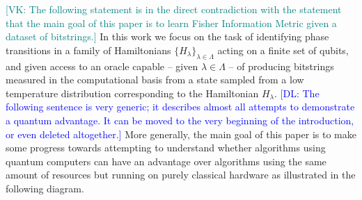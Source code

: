 \documentclass[american,aps,pra,reprint,floatfix,nofootinbib,superscriptaddress]{revtex4-2}
\newcommand{\VK}[1]{\textcolor{teal}{[VK: #1]}}
\newcommand{\DL}[1]{\textcolor{blue}{[DL: #1]}}
\begin{document}
\VK{The following statement is in the direct contradiction with the statement
that the main goal of this paper is to learn Fisher Information Metric
given a dataset of bitstrings.}
In this work we focus on the task of identifying phase transitions in a
family of Hamiltonians $\{H_{\lambda}\}_{\lambda \in \Lambda}$ acting on a finite
set of qubits, and given access to an oracle capable -- given $\lambda \in \Lambda$ --
of producing bitstrings measured in the computational basis from a state sampled
from a low temperature distribution corresponding to the Hamiltonian
$H_{\lambda}$. 
\DL{The following sentence is very generic; it describes almost all attempts to demonstrate a quantum advantage. It can be moved to the very beginning of the introduction, or even deleted altogether.}
More generally,
the main goal of this paper is to make some
progress towards attempting to understand whether algorithms using
quantum computers can have an advantage over algorithms using the
same amount of resources but running on
purely classical hardware as illustrated in the following diagram.
\end{document}
